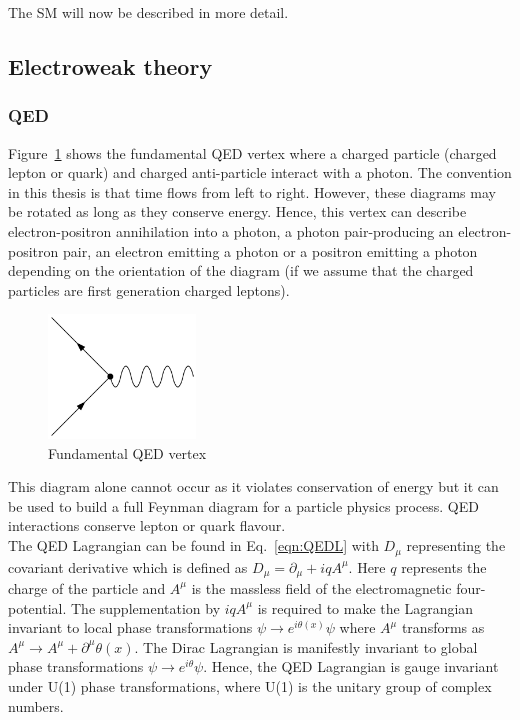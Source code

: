 The SM will now be described in more detail.

\subsection{Electroweak theory}

\subsubsection{QED}
\label{subsec:QED}

Figure~\ref{fig:QEDvertex} shows the fundamental QED vertex where a charged particle (charged lepton or quark) and charged anti-particle interact with a photon. The convention in this thesis is that time flows from left to right. However, these diagrams may be rotated as long as they conserve energy. Hence, this vertex can describe electron-positron annihilation into a photon, a photon pair-producing an electron-positron pair, an electron emitting a photon or a positron emitting a photon depending on the orientation of the diagram (if we assume that the charged particles are first generation charged leptons). 

\begin{figure}[ht!]
\begin{center}
    \includegraphics[width=0.35\textwidth]{images/Theory/QEDvertex.png}
    \caption{Fundamental QED vertex}
    \label{fig:QEDvertex}
\end{center}
\end{figure}

This diagram alone cannot occur as it violates conservation of energy but it can be used to build a full Feynman diagram for a particle physics process. QED interactions conserve lepton or quark flavour. \\
The QED Lagrangian can be found in Eq.~\ref{eqn:QEDL} with $D_{\mu}$ representing the covariant derivative which is defined as $D_{\mu} = \partial_{\mu} + iqA^{\mu}$. Here $q$ represents the charge of the particle and $A^{\mu}$ is the massless field of the electromagnetic four-potential. The supplementation by $iqA^{\mu}$ is required to make the Lagrangian invariant to local phase transformations $\psi \rightarrow e^{i\theta(x)} \psi$ where $A^{\mu}$ transforms as $A^{\mu} \rightarrow A^{\mu} + \partial^{\mu}\theta(x)$. The Dirac Lagrangian is manifestly invariant to global phase transformations $\psi \rightarrow e^{i\theta} \psi$. Hence, the QED Lagrangian is gauge invariant under U(1) phase transformations, where U(1) is the unitary group of complex numbers. 


